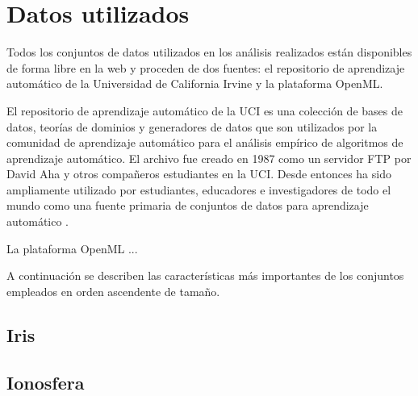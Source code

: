 \section{Datos utilizados}
\label{sec:datasets}


Todos los conjuntos de datos utilizados en los análisis realizados están disponibles de forma libre en la web y proceden de dos fuentes: el repositorio de aprendizaje automático de la Universidad de California Irvine y la plataforma OpenML.

El repositorio de aprendizaje automático de la UCI es una colección de bases de datos, teorías de dominios y generadores de datos que son utilizados por la comunidad de aprendizaje automático para el análisis empírico de algoritmos de aprendizaje automático. El archivo fue creado en 1987 como un servidor FTP por David Aha y otros compañeros estudiantes en la UCI. Desde entonces ha sido ampliamente utilizado por estudiantes, educadores e investigadores de todo el mundo como una fuente primaria de conjuntos de datos para aprendizaje automático \cite{ml-uci}.

La plataforma OpenML ... 

A continuación se describen las características más importantes de los conjuntos empleados en orden ascendente de tamaño.

\subsection{Iris}

\subsection{Ionosfera}

